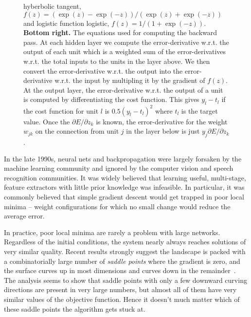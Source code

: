 \documentclass[10pts]{article}
\newcommand{\citep}[1]{\cite{#1}}
\begin{document}
\begin{figure}[b]
{\begin{minipage}{\textwidth}
{hyberbolic tangent, $f(z) = (\exp(z)-\exp(-z))/(\exp(z)+\exp(-z))$ 
and logistic function logistic, $f(z) = 1/(1+\exp(-z))$.
{\bf Bottom right.} 
The equations used for computing the backward pass. At each
hidden layer we compute the error-derivative w.r.t. the output of each
unit which is a weighted sum of the error-derivatives w.r.t. the total
inputs to the units in the layer above. We then convert the
error-derivative w.r.t. the output into the error-derivative w.r.t.
the input by multipling it by the gradient of $f(z)$.  At the output
layer, the error-derivative w.r.t. the output of a unit is computed by
differentiating the cost function. This gives $y_l-t_l$ if the cost
function for unit $l$ is $0.5(y_l-t_l)^2$ where $t_l$ is the target
value. Once the $\partial E/\partial z_k$ is known, the
error-derivative for the weight $w_{jk}$ on the connection from unit
$j$ in the layer below is just $y_j \partial E/\partial z_k$.
}
\label{fig:backprop-box}
\end{minipage}
}
\end{figure}


In the late 1990s, neural nets and backpropagation were largely
forsaken by the machine learning community and ignored by the computer
vision and speech recognition communities.  It was widely believed
that learning useful, multi-stage, feature extractors with little prior knowledge 
was infeasible. In particular, it was commonly
believed that simple gradient descent would get trapped in poor
local minima -- weight configurations for which no small change would
reduce the average error.

In practice, poor local minima are rarely a problem with large networks. Regardless
of the initial conditions, the system nearly always reaches solutions
of very similar quality.  Recent results strongly suggest the
landscape is packed with a combinatorially large number of {\em saddle
  points} where the gradient is zero, and the surface curves up in
most dimensions and curves down in the 
remainder~\citep{Dauphin-et-al-NIPS2014-small,Choromanska-et-al-AISTATS2015}.
The analysis seems to show that saddle points with
only a few downward curving directions are present in very large
numbers, but almost all of them have very similar values of the
objective function.  Hence it doesn't much matter which of these
saddle points the algorithm gets stuck at.
\end{document}
